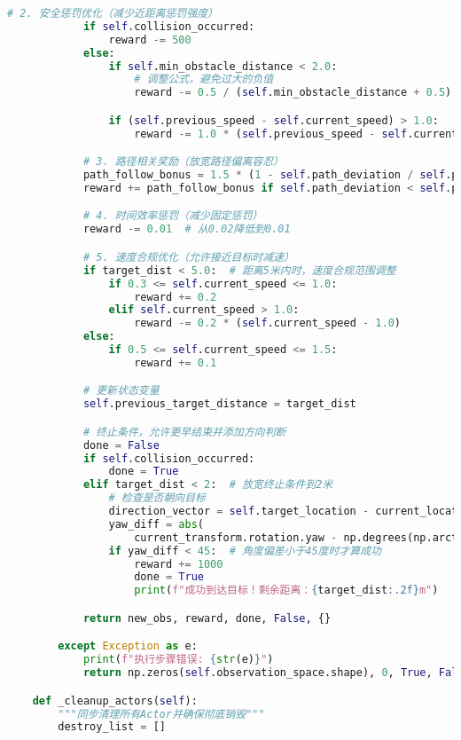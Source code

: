 \begin{lstlisting}[language=Python]
            # 2. 安全惩罚优化（减少近距离惩罚强度）
            if self.collision_occurred:
                reward -= 500
            else:
                if self.min_obstacle_distance < 2.0:
                    # 调整公式，避免过大的负值
                    reward -= 0.5 / (self.min_obstacle_distance + 0.5)  # 原为1.5/(d+0.1)

                if (self.previous_speed - self.current_speed) > 1.0:
                    reward -= 1.0 * (self.previous_speed - self.current_speed)  # 惩罚减半

            # 3. 路径相关奖励（放宽路径偏离容忍）
            path_follow_bonus = 1.5 * (1 - self.path_deviation / self.path_radius)  # 系数从1.0提升至1.5
            reward += path_follow_bonus if self.path_deviation < self.path_radius else -1.0  # 惩罚从-3.0减至-1.0

            # 4. 时间效率惩罚（减少固定惩罚）
            reward -= 0.01  # 从0.02降低到0.01

            # 5. 速度合规优化（允许接近目标时减速）
            if target_dist < 5.0:  # 距离5米内时，速度合规范围调整
                if 0.3 <= self.current_speed <= 1.0:
                    reward += 0.2
                elif self.current_speed > 1.0:
                    reward -= 0.2 * (self.current_speed - 1.0)
            else:
                if 0.5 <= self.current_speed <= 1.5:
                    reward += 0.1

            # 更新状态变量
            self.previous_target_distance = target_dist

            # 终止条件，允许更早结束并添加方向判断
            done = False
            if self.collision_occurred:
                done = True
            elif target_dist < 2:  # 放宽终止条件到2米
                # 检查是否朝向目标
                direction_vector = self.target_location - current_location
                yaw_diff = abs(
                    current_transform.rotation.yaw - np.degrees(np.arctan2(-direction_vector.y, direction_vector.x)))
                if yaw_diff < 45:  # 角度偏差小于45度时才算成功
                    reward += 1000
                    done = True
                    print(f"成功到达目标！剩余距离：{target_dist:.2f}m")

            return new_obs, reward, done, False, {}

        except Exception as e:
            print(f"执行步骤错误: {str(e)}")
            return np.zeros(self.observation_space.shape), 0, True, False, {}

    def _cleanup_actors(self):
        """同步清理所有Actor并确保彻底销毁"""
        destroy_list = []


\end{lstlisting}
